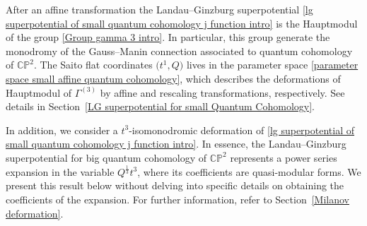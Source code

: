 \documentclass[pdftex]{sigma}
\numberwithin{equation}{section}
\begin{document}
After an affine transformation the Landau--Ginzburg superpotential \eqref{lg superpotential of small quantum cohomology j function intro} is the Hauptmodul of the group \eqref{Group gamma 3 intro}. In particular, this group generate the monodromy of the Gauss--Manin connection associated to quantum cohomology of $\mathbb{CP}^2$. The Saito flat coordinates $\bigl(t^1,Q\bigr)$ lives in the parameter space \eqref{parameter space small affine quantum cohomology}, which describes the deformations of Hauptmodul of $\Gamma^{(3)}$ by affine and rescaling transformations, respectively.
See details in Section~\ref{LG superpotential for small Quantum Cohomology}.

In addition, we consider a $t^3$-isomonodromic deformation of \eqref{lg superpotential of small quantum cohomology j function intro}. In essence, the Landau--Ginzburg superpotential for big quantum cohomology of $\mathbb{CP}^2$ represents a power series expansion in the variable $Q^{\frac{1}{3}}t^3$, where its coefficients are quasi-modular forms. We present this result below without delving into specific details on obtaining the coefficients of the expansion. For further information, refer to Section~\ref{Milanov deformation}.
\end{document}
